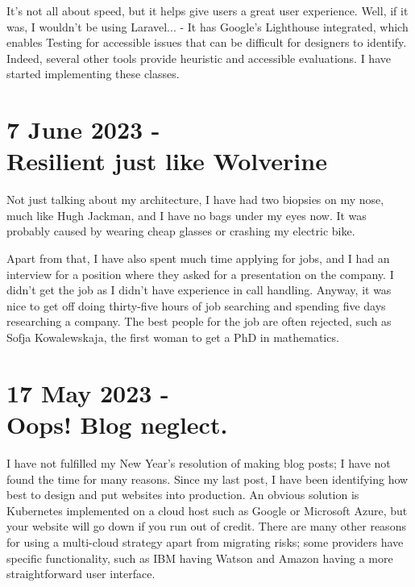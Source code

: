 \documentclass{article}
\begin{document}
It's not all about speed, but it helps give users a great user experience. Well, if it was, I wouldn't be using Laravel... - It has Google's Lighthouse integrated, which enables Testing for accessible issues that can be difficult for designers to identify. Indeed, several other tools provide heuristic and accessible evaluations. I have started implementing these classes.



\section*{7 June 2023 - \\ Resilient just like Wolverine}

Not just talking about my architecture, I have had two biopsies on my nose, much like Hugh Jackman, and I have no bags under my eyes now. It was probably caused by wearing cheap glasses or crashing my electric bike. 

Apart from that, I have also spent much time applying for jobs, and I had an interview for a position where they asked for a presentation on the company. I didn't get the job as I didn't have experience in call handling. Anyway, it was nice to get off doing thirty-five hours of job searching and spending five days researching a company. The best people for the job are often rejected, such as Sofja Kowalewskaja, the first woman to get a PhD in mathematics.

\section*{17 May 2023 - \\ Oops! Blog neglect.}

I have not fulfilled my New Year's resolution of making blog posts; I have not found the time for many reasons. Since my last post, I have been identifying how best to design and put websites into production. An obvious solution is Kubernetes implemented on a cloud host such as Google or Microsoft Azure, but your website will go down if you run out of credit. There are many other reasons for using a multi-cloud strategy apart from migrating risks; some providers have specific functionality, such as IBM having Watson and Amazon having a more straightforward user interface. 
\end{document}
